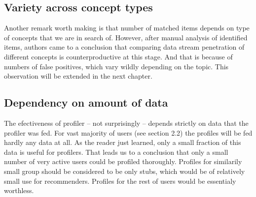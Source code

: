 \subsection{Variety across concept types}
Another remark worth making is that number of matched items depends on type of
concepts that we are in search of. However, after manual analysis of identified
items, authors came to a conclusion that comparing data stream penetration of
different concepts is counterproductive at this stage. And that is because of
numbers of false positives, which vary wildly depending on the topic. This
observation will be extended in the next chapter.

\subsection{Dependency on amount of data}
The efectiveness of profiler -- not surprisingly -- depends strictly on data
that the profiler was fed. For vast majority of users (see section 2.2) the
profiles will be fed hardly any data at all. As the reader just learned, only a
small fraction of this data is useful for profilers. That leads us to a
conclusion that only a small number of very active users could be profiled
thoroughly. Profiles for similarily small group should be considered to be only
stubs, which would be of relatively small use for recommenders. Profiles for the
rest of users would be essentialy worthless.
